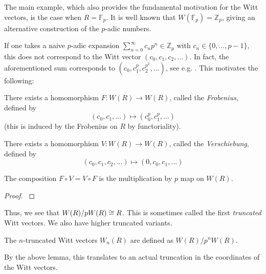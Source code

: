 The main example, which also provides the fundamental motivation
for the Witt vectors, is the case when \(R = \mathbb{F}_{p}\).
It is well known that \(W(\mathbb{F}_{p}) = \mathbb{Z}_{p}\), 
giving an alternative construction of the \(p\)-adic numbers.

\begin{warn}
	If one takes a
    naive \(p\)-adic expansion 
    \(\sum_{n = 0}^{\infty} c_{n}p^{n} \in \mathbb{Z}_{p}\)
    with \(c_{n} \in \{0, \ldots, p-1\}\), this does not correspond
    to the Witt vector \((c_{0}, c_{1}, c_{2}, \ldots)\).
    In fact, the aforementioned sum corresponds to 
    \((c_{0}, c_{1}^{p}, c_{2}^{p^{2}}, \ldots)\), see
	e.g. \cite[Section~2]{kim-2017-witt-vec}. 
    This motivates the following: 
\end{warn}


\begin{defn}
	There exists a homomorphism \(F \colon W(R) \xrightarrow{} W(R)\),
	called the \textit{Frobenius},
	defined by
	\[
	 (c_{0}, c_{1}, \ldots) \mapsto (c_{0}^{p}, c_{1}^{p}, \ldots)
	\] 
	(this is induced by the Frobenius on \(R\) by functoriality).
\end{defn}

\begin{defn}
	There exists a homomorphism \(V \colon W(R) \xrightarrow{} W(R)\),
	called the \textit{Verschiebung},
	defined by
	\[
		(c_{0}, c_{1}, c_{2}, \ldots) \mapsto  (0, c_{0}, c_{1}, \ldots)
	\] 
\end{defn}

\begin{lem}
	The composition \(F \circ V = V \circ F\) is the multiplication by
	\(p\) map on \(W(R)\).
\end{lem}

\begin{proof}
	\cite[Proposition~5]{kim-2017-witt-vec}
\end{proof}

Thus, we see that \(W(R) / pW(R) \cong R\).
This is sometimes called the first \textit{truncated}
Witt vectors.
We also have higher truncated variants.

\begin{defn}
	The \(n\)-truncated Witt vectors
	\(W_{n}(R)\) are defined as
	\(W(R) / p^{n}W(R)\).
\end{defn}

By the above lemma, this translates to an actual truncation
in the coordinates of the Witt vectors.

